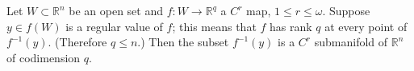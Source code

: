 Let $W \subset \mathbb{R}^n$ be an open set and $f: W \to \mathbb{R}^q$ a $C^r$ map, $1 \leqslant r \leqslant \omega$. Suppose $y \in f(W)$ is a regular value of $f$; this means that $f$ has rank $q$ at every point of $f^{-1}(y)$. (Therefore $q \leqslant n$.) Then the subset $f^{-1}(y)$ is a $C^r$ submanifold of $\mathbb{R}^n$ of codimension $q$.
